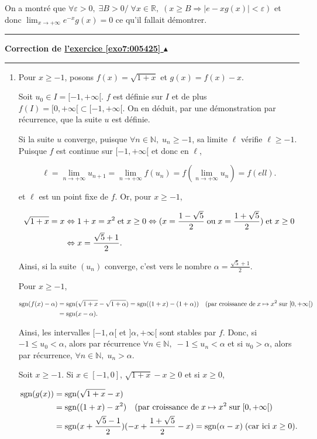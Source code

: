 \documentclass[11pt,a4paper]{article}
\newcommand{\Nn}{\mathbb{N}} \newcommand{\N}{\mathbb{N}}
\newcommand{\Rr}{\mathbb{R}} \newcommand{\R}{\mathbb{R}}
\newcounter{exo}
\newcommand{\correction}[1]{\hypertarget{cor7:#1}{}\label{cor7:#1}{\bf Correction de \hyperlink{exo7:#1}{l'exercice \ref{exo7:#1} $\blacktriangle$}}\vspace{1mm}\hrule\vspace{1mm}}
\newcommand{\fincorrection}{\vspace{1mm}\hrule\vspace*{7mm}}
\begin{document}
On a montré que $\forall\varepsilon>0,\;\exists B>0/\;\forall x\in\Rr,\;(x\geq B\Rightarrow|e-xg(x)|<\varepsilon)$ et donc $\lim_{x\rightarrow +\infty}e^{-x}g(x)=0$ ce qu'il fallait démontrer.
\fincorrection
\correction{005425}
\begin{enumerate}
\item  Pour $x\geq-1$, posons $f(x)=\sqrt{1+x}$ et $g(x)=f(x)-x$.

Soit $u_0\in I=[-1,+\infty[$. $f$ est définie sur $I$ et de plus $f(I)=[0,+\infty[\subset[-1,+\infty[$. On en déduit, par une démonstration par récurrence, que la suite $u$ est définie.

Si la suite $u$ converge, puisque $\forall n\in\Nn,\;u_n\geq-1$, sa limite $\ell$ vérifie $\ell\geq-1$. Puisque $f$ est continue sur $[-1,+\infty[$ et donc en $\ell$,

$$\ell=\lim_{n\rightarrow +\infty}u_{n+1}=\lim_{n\rightarrow +\infty}f(u_n)=f(\lim_{n\rightarrow +\infty}u_n)=f(ell).$$

et $\ell$ est un point fixe de $f$. Or, pour $x\geq-1$,

\begin{align*}\ensuremath
\sqrt{1+x}=x&\Leftrightarrow1+x=x^2\;\mbox{et}\;x\geq0\Leftrightarrow(x=\frac{1-\sqrt{5}}{2}\;\mbox{ou}\;x=\frac{1+\sqrt{5}}{2})\;
\mbox{et}\;x\geq0\\
 &\Leftrightarrow x=\frac{\sqrt{5}+1}{2}.
\end{align*}

Ainsi, si la suite $(u_n)$ converge, c'est vers le nombre $\alpha=\frac{\sqrt{5}+1}{2}$.

Pour $x\geq-1$,

\begin{align*}\ensuremath
\mbox{sgn}(f(x)-\alpha)&=\mbox{sgn}(\sqrt{1+x}-\sqrt{1+\alpha})=\mbox{sgn}((1+x)-(1+\alpha))\quad(\mbox{par croissance de}\;x\mapsto x^2\;\mbox{sur}\;[0,+\infty[)\\
 &=\mbox{sgn}(x-\alpha).
\end{align*}

Ainsi, les intervalles $[-1,\alpha[$ et $]\alpha,+\infty[$ sont stables par $f$. Donc, si $-1\leq u_0<\alpha$, alors par récurrence $\forall n\in\Nn,\;-1\leq u_n<\alpha$ et si $u_0>\alpha$, alors par récurrence, $\forall n\in\Nn,\;u_n>\alpha$.

Soit $x\geq-1$. Si $x\in[-1,0]$, $\sqrt{1+x}-x\geq0$ et si $x\geq0$,

\begin{align*}\ensuremath
\mbox{sgn}(g(x))&=\mbox{sgn}(\sqrt{1+x}-x)\\
 &=\mbox{sgn}((1+x)-x^2)\quad(\mbox{par croissance de}\;x\mapsto x^2\;\mbox{sur}\;[0,+\infty[)\\
 &=\mbox{sgn}(x+\frac{\sqrt{5}-1}{2})(-x+\frac{1+\sqrt{5}}{2}-x)=\mbox{sgn}(\alpha-x)\;(\mbox{car ici}\;x\geq0).
\end{align*}


\end{enumerate}
\end{document}
